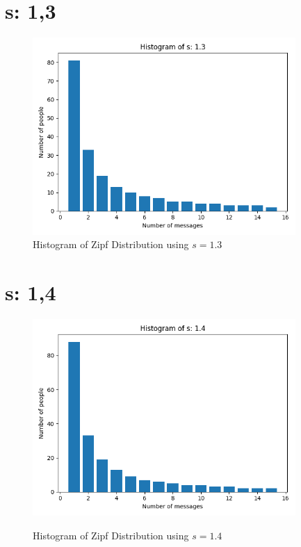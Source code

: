 \documentclass{article}
\begin{document}
\section{s: 1,3}
\begin{figure}[H] 
	\centering
	\includegraphics[width=10cm]{imgs/histogram-13.png}
	\caption{Histogram of Zipf Distribution using $s=1.3$}
	\label{fig:hist-13}
  \end{figure}






\section{s: 1,4}
\begin{figure}[H] \centering
 \includegraphics[width=10cm]{imgs/histogram-14.png}
 \label{fig:hist-14}
 \caption{Histogram of Zipf Distribution using $s=1.4$} \end{figure}


\end{document}
